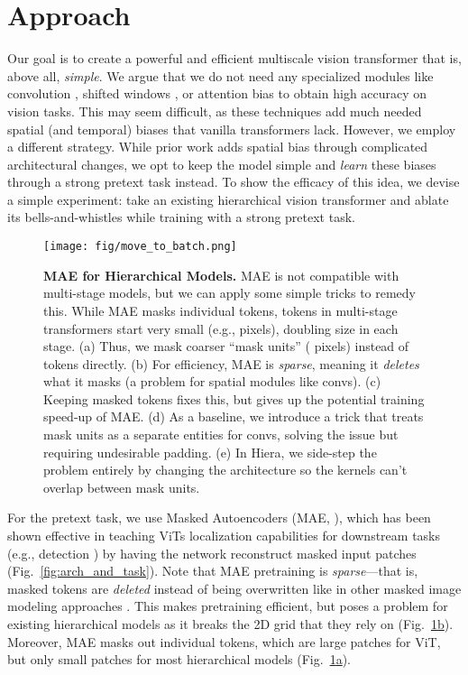 \documentclass[nohyperref]{article}
\newcommand{\shortname}{{Hiera}}
\theoremstyle{plain}
\theoremstyle{definition}
\theoremstyle{remark}
\begin{document}
\section{Approach} \label{sec:approach}


Our goal is to create a powerful and efficient multiscale vision transformer that is, above all, \textit{simple}. We argue that we do not need any specialized modules like convolution \cite{mvitv1}, shifted windows \cite{swin}, or attention bias \cite{levit,mvitv2} to obtain high accuracy on vision tasks. This may seem difficult, as these techniques add much needed spatial (and temporal) biases that vanilla transformers \cite{vit} lack. However, we employ a different strategy. While prior work adds spatial bias through complicated architectural changes, we opt to keep the model simple and \textit{learn} these biases through a strong pretext task instead. To show the efficacy of this idea, we devise a simple experiment: take an existing hierarchical vision transformer and ablate its bells-and-whistles while training with a strong pretext task.

\begin{figure}[t]
\centering
\texttt{[image: fig/move\_to\_batch.png]}
\vspace{-.3em}

\caption{\textbf{MAE for Hierarchical Models.}
MAE is not compatible with multi-stage models, but we can apply some simple tricks to remedy this.
While MAE masks individual tokens, tokens in multi-stage transformers start very small (e.g.,  pixels), doubling size in each stage.
(a) Thus, we mask coarser ``mask units'' ( pixels) instead of tokens directly.
(b) For efficiency, MAE is \textit{sparse}, meaning it \textit{deletes} what it masks (a problem for spatial modules like convs).
(c) Keeping masked tokens fixes this, but gives up the potential  training speed-up of MAE.
(d) As a baseline, we introduce a trick that treats mask units as a separate entities for convs, solving the issue but requiring undesirable padding.
(e) In \shortname{}, we side-step the problem entirely by changing the architecture so the kernels can't overlap between mask units.
}
\label{fig:architecture_overlap}
\vspace{-1em}
\end{figure}


For the pretext task, we use Masked Autoencoders (MAE, \citet{mae}), which has been shown effective in teaching ViTs localization capabilities for downstream tasks (e.g., detection \cite{vitdet}) by having the network reconstruct masked input patches (Fig.~\ref{fig:arch_and_task}). Note that MAE pretraining is \textit{sparse}---that is, masked tokens are \textit{deleted} instead of being overwritten like in other masked image modeling approaches \cite{maskfeat,xie2021simmim}. This makes pretraining efficient, but poses a problem for existing hierarchical models as it breaks the 2D grid that they rely on (Fig.~\ref{fig:architecture_overlap}\hyperref[fig:architecture_overlap]{b}). Moreover, MAE masks out individual tokens, which are large  patches for ViT, but only small  patches for most hierarchical models (Fig.~\ref{fig:architecture_overlap}\hyperref[fig:architecture_overlap]{a}).
\end{document}
